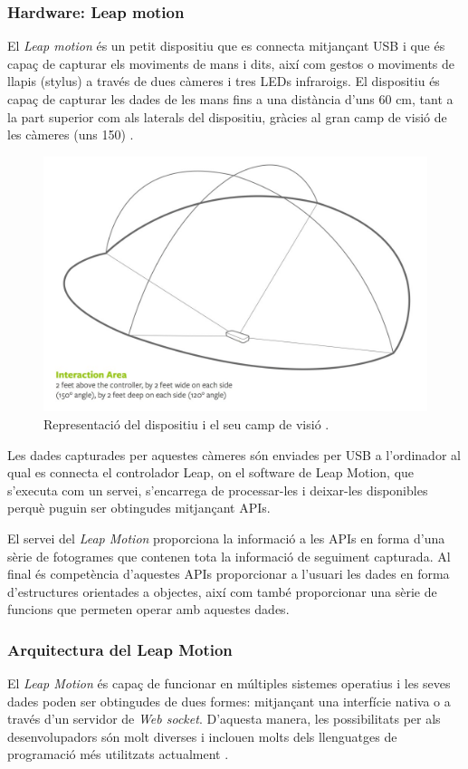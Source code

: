 \documentclass[12pt,a4paper,catalan]{article}
\begin{document}
	\subsubsection{Hardware: Leap motion}
	El \textit{Leap motion} és un petit dispositiu que es connecta mitjançant USB i que és capaç de capturar els moviments de mans i dits, així com gestos o moviments de llapis (stylus) a través de dues càmeres i tres LEDs infraroigs. El dispositiu és capaç de capturar les dades de les mans fins a una distància d'uns 60 cm, tant a la part superior com als laterals del dispositiu, gràcies al gran camp de visió de les càmeres (uns 150\textdegree) \cite{leapcharacteristics}.
	\begin{figure}[H]
		\includegraphics[width=\textwidth,keepaspectratio]{leap-motion-interaction-area.png}
		\centering
		\caption{Representació del dispositiu i el seu camp de visió \protect\cite{leapcharacteristics}.}
	\end{figure}
	Les dades capturades per aquestes càmeres són enviades per USB a l'ordinador al qual es connecta el controlador Leap, on el software de Leap Motion, que s'executa com un servei, s'encarrega de processar-les i deixar-les disponibles perquè puguin ser obtingudes mitjançant APIs.
	
	El servei del \textit{Leap Motion} proporciona la informació a les APIs en forma d'una sèrie de fotogrames que contenen tota la informació de seguiment capturada. Al final és competència d'aquestes APIs proporcionar a l'usuari les dades en forma d'estructures orientades a objectes, així com també proporcionar una sèrie de funcions que permeten operar amb aquestes dades.
	\subsubsection{Arquitectura del Leap Motion}
	El \textit{Leap Motion} és capaç de funcionar en múltiples sistemes operatius i les seves dades poden ser obtingudes de dues formes: mitjançant una interfície nativa o a través d'un servidor de \textit{Web socket}. D'aquesta manera, les possibilitats per als desenvolupadors són molt diverses i inclouen molts dels llenguatges de programació més utilitzats actualment \cite{leapsdkdocs}.
	
\end{document}
